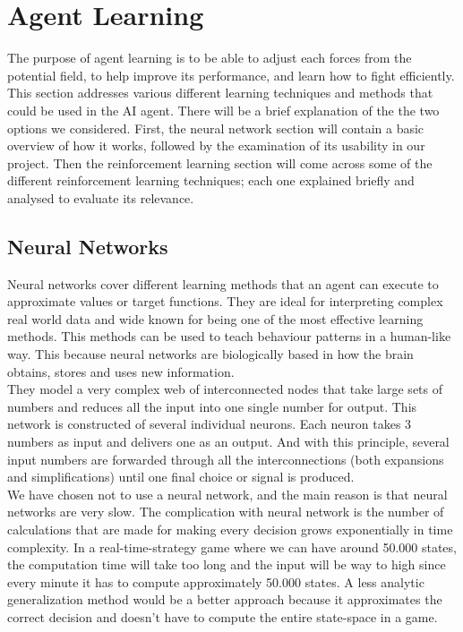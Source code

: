 \section{Agent Learning}\label{agent_learning}
The purpose of agent learning is to be able to adjust each forces from the potential field, to help improve its performance, and learn how to fight efficiently.\\

This section addresses various different learning techniques and methods that could be used in the AI agent. There will be a brief explanation of the the two options we considered. First, the neural network section will contain a basic overview of how it works, followed by the examination of its usability in our project. Then the reinforcement learning section will come across some of the different reinforcement learning techniques;  each one explained briefly and analysed to evaluate its relevance. \\

\subsection*{Neural Networks}
Neural networks cover different learning methods that an agent can execute to approximate values or target functions. They are ideal for interpreting complex real world data and wide known for being one of the most effective learning methods. This methods can be used to teach behaviour patterns in a human-like way. This because neural networks are biologically based in how the brain obtains, stores and uses new information.\\


They model a very complex web of interconnected nodes that take large sets of numbers and reduces all the input into one single number for output. This network is constructed of several individual neurons. Each neuron takes 3 numbers as input and delivers one as an output. And with this principle, several input numbers are forwarded through all the interconnections (both expansions and simplifications) until one final choice or signal is produced. \\


We have chosen not to use a neural network, and the main reason is that neural networks are very slow. The complication with neural network is the number of calculations that are made for making every decision grows exponentially in time complexity. In a real-time-strategy game where we can have around 50.000 states, the computation time will take too long and the input will be way to high since every minute it has to compute approximately 50.000 states. A less analytic generalization method would be a better approach because it approximates the correct decision and doesn't have to compute the entire state-space in a game. \\


